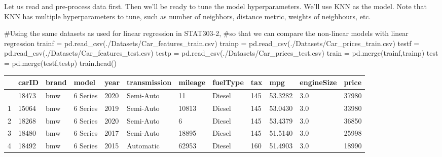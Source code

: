 \documentclass[
  letterpaper,
  DIV=11,
  numbers=noendperiod]{scrreprt}
\newenvironment{Shaded}{\begin{snugshade}}{\end{snugshade}}
\newcommand{\CommentTok}[1]{\textcolor[rgb]{0.37,0.37,0.37}{#1}}
\newcommand{\NormalTok}[1]{\textcolor[rgb]{0.00,0.23,0.31}{#1}}
\newcommand{\OperatorTok}[1]{\textcolor[rgb]{0.37,0.37,0.37}{#1}}
\newcommand{\StringTok}[1]{\textcolor[rgb]{0.13,0.47,0.30}{#1}}
\begin{document}
Let us read and pre-process data first. Then we'll be ready to tune the
model hyperparameters. We'll use KNN as the model. Note that KNN has
multiple hyperparameters to tune, such as number of neighbors, distance
metric, weights of neighbours, etc.

\begin{Shaded}
\begin{Highlighting}[]
\CommentTok{\#Using the same datasets as used for linear regression in STAT303{-}2, }
\CommentTok{\#so that we can compare the non{-}linear models with linear regression}
\NormalTok{trainf }\OperatorTok{=}\NormalTok{ pd.read\_csv(}\StringTok{\textquotesingle{}./Datasets/Car\_features\_train.csv\textquotesingle{}}\NormalTok{)}
\NormalTok{trainp }\OperatorTok{=}\NormalTok{ pd.read\_csv(}\StringTok{\textquotesingle{}./Datasets/Car\_prices\_train.csv\textquotesingle{}}\NormalTok{)}
\NormalTok{testf }\OperatorTok{=}\NormalTok{ pd.read\_csv(}\StringTok{\textquotesingle{}./Datasets/Car\_features\_test.csv\textquotesingle{}}\NormalTok{)}
\NormalTok{testp }\OperatorTok{=}\NormalTok{ pd.read\_csv(}\StringTok{\textquotesingle{}./Datasets/Car\_prices\_test.csv\textquotesingle{}}\NormalTok{)}
\NormalTok{train }\OperatorTok{=}\NormalTok{ pd.merge(trainf,trainp)}
\NormalTok{test }\OperatorTok{=}\NormalTok{ pd.merge(testf,testp)}
\NormalTok{train.head()}
\end{Highlighting}
\end{Shaded}

\begin{longtable}[]{@{}llllllllllll@{}}
\toprule\noalign{}
& carID & brand & model & year & transmission & mileage & fuelType & tax
& mpg & engineSize & price \\
\midrule\noalign{}
\endhead
\bottomrule\noalign{}
\endlastfoot
0 & 18473 & bmw & 6 Series & 2020 & Semi-Auto & 11 & Diesel & 145 &
53.3282 & 3.0 & 37980 \\
1 & 15064 & bmw & 6 Series & 2019 & Semi-Auto & 10813 & Diesel & 145 &
53.0430 & 3.0 & 33980 \\
2 & 18268 & bmw & 6 Series & 2020 & Semi-Auto & 6 & Diesel & 145 &
53.4379 & 3.0 & 36850 \\
3 & 18480 & bmw & 6 Series & 2017 & Semi-Auto & 18895 & Diesel & 145 &
51.5140 & 3.0 & 25998 \\
4 & 18492 & bmw & 6 Series & 2015 & Automatic & 62953 & Diesel & 160 &
51.4903 & 3.0 & 18990 \\
\end{longtable}
\end{document}

